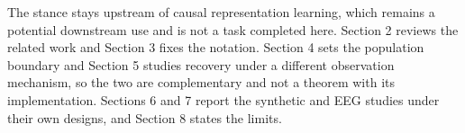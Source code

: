 The stance stays upstream of causal representation learning, which
remains a potential downstream use and is not a task completed here.
Section 2 reviews the related work and Section 3 fixes the notation.
Section 4 sets the population boundary and Section 5 studies recovery
under a different observation mechanism, so the two are complementary
and not a theorem with its implementation. Sections 6 and 7 report the
synthetic and EEG studies under their own designs, and Section 8 states
the limits.
